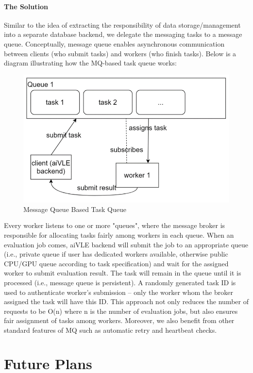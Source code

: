 \documentclass[fyp]{socreport}
\begin{document}
\subsubsection{The Solution}
Similar to the idea of extracting the responsibility of data storage/management into a separate database backend, we delegate the messaging tasks to a message queue. Conceptually, message queue enables asynchronous communication between clients (who submit tasks) and workers (who finish tasks). Below is a diagram illustrating how the MQ-based task queue works:
\begin{figure}[H]
    \centering
    \includegraphics{images/aivle-web-mq.png}
    \caption{Message Queue Based Task Queue}
    \label{fig:aivle-web-mq}
\end{figure}
Every worker listens to one or more "queues", where the message broker is responsible for allocating tasks fairly among workers in each queue. When an evaluation job comes, aiVLE backend will submit the job to an appropriate queue (i.e., private queue if user has dedicated workers available, otherwise public CPU/GPU queue according to task specification) and wait for the assigned worker to submit evaluation result. The task will remain in the queue until it is processed (i.e., message queue is persistent). A randomly generated task ID is used to authenticate worker's submission – only the worker whom the broker assigned the task will have this ID. This approach not only reduces the number of requests to be O(n) where n is the number of evaluation jobs, but also ensures fair assignment of tasks among workers. Moreover, we also benefit from other standard features of MQ such as automatic retry and heartbeat checks.

\chapter{Future Plans}
\label{ch:future-plans}
\end{document}
